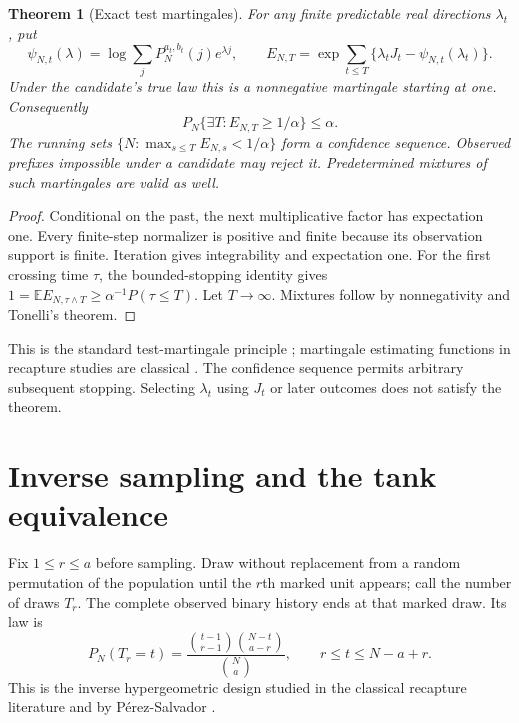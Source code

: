 \documentclass[11pt]{article}
\newtheorem{theorem}{Theorem}[section]
\theoremstyle{remark}\newtheorem{remark}[theorem]{Remark}
\newcommand{\E}{\mathbb E}\newcommand{\PP}{\mathbb P}
\begin{document}
\begin{theorem}[Exact test martingales]\label{thm:martingale}
For any finite predictable real directions $\lambda_t$, put
\[
 \psi_{N,t}(\lambda)=\log\sum_jP_N^{a_t,b_t}(j)e^{\lambda j},\qquad
 E_{N,T}=\exp\sum_{t\le T}\{\lambda_tJ_t-\psi_{N,t}(\lambda_t)\}.
\]
Under the candidate's true law this is a nonnegative martingale starting at
one. Consequently
\[
 P_N\{\exists T:E_{N,T}\ge1/\alpha\}\le\alpha.
\]
The running sets $\{N:\max_{s\le T}E_{N,s}<1/\alpha\}$ form a confidence
sequence. Observed prefixes impossible under a candidate may reject it.
Predetermined mixtures of such martingales are valid as well.
\end{theorem}
\begin{proof}
Conditional on the past, the next multiplicative factor has expectation one.
Every finite-step normalizer is positive and finite because its observation
support is finite. Iteration gives integrability and expectation one.
For the first crossing time $\tau$, the bounded-stopping identity gives
$1=\E E_{N,\tau\wedge T}\ge\alpha^{-1}P(\tau\le T)$.
Let $T\to\infty$. Mixtures follow by nonnegativity and Tonelli's theorem.
\end{proof}
This is the standard test-martingale principle \cite{Howard2021}; martingale
estimating functions in recapture studies are classical \cite{Lloyd1994}.
The confidence sequence permits arbitrary subsequent stopping. Selecting
$\lambda_t$ using $J_t$ or later outcomes does not satisfy the theorem.

\section{Inverse sampling and the tank equivalence}
Fix $1\le r\le a$ before sampling. Draw without replacement from a random
permutation of the population until the $r$th marked unit appears; call the
number of draws $T_r$. The complete observed binary history ends at that
marked draw. Its law is
\begin{equation}\label{eq:inverse}
 P_N(T_r=t)=\frac{\binom{t-1}{r-1}\binom{N-t}{a-r}}{\binom Na},
 \qquad r\le t\le N-a+r.
\end{equation}
This is the inverse hypergeometric design studied in the classical recapture
literature \cite{Bailey1951,Chapman1951} and by
P\'erez-Salvador \cite{Perez2026}.
\end{document}

